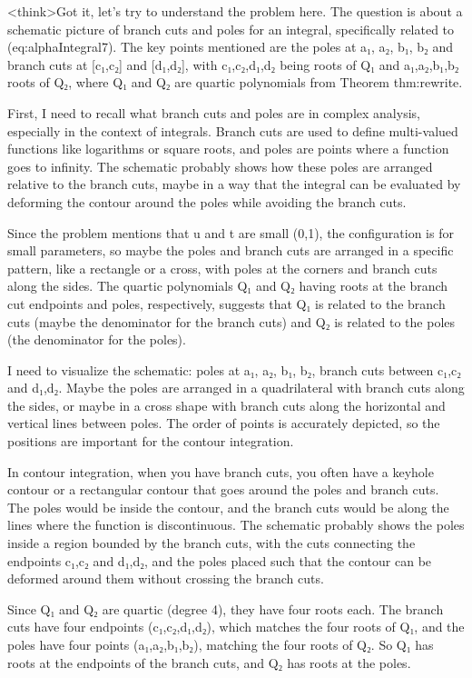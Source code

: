 <think>Got it, let's try to understand the problem here. The question is about a schematic picture of branch cuts and poles for an integral, specifically related to (eq:alphaIntegral7). The key points mentioned are the poles at a₁, a₂, b₁, b₂ and branch cuts at [c₁,c₂] and [d₁,d₂], with c₁,c₂,d₁,d₂ being roots of Q₁ and a₁,a₂,b₁,b₂ roots of Q₂, where Q₁ and Q₂ are quartic polynomials from Theorem thm:rewrite. 

First, I need to recall what branch cuts and poles are in complex analysis, especially in the context of integrals. Branch cuts are used to define multi-valued functions like logarithms or square roots, and poles are points where a function goes to infinity. The schematic probably shows how these poles are arranged relative to the branch cuts, maybe in a way that the integral can be evaluated by deforming the contour around the poles while avoiding the branch cuts.

Since the problem mentions that u and t are small (0,1), the configuration is for small parameters, so maybe the poles and branch cuts are arranged in a specific pattern, like a rectangle or a cross, with poles at the corners and branch cuts along the sides. The quartic polynomials Q₁ and Q₂ having roots at the branch cut endpoints and poles, respectively, suggests that Q₁ is related to the branch cuts (maybe the denominator for the branch cuts) and Q₂ is related to the poles (the denominator for the poles).

I need to visualize the schematic: poles at a₁, a₂, b₁, b₂, branch cuts between c₁,c₂ and d₁,d₂. Maybe the poles are arranged in a quadrilateral with branch cuts along the sides, or maybe in a cross shape with branch cuts along the horizontal and vertical lines between poles. The order of points is accurately depicted, so the positions are important for the contour integration.

In contour integration, when you have branch cuts, you often have a keyhole contour or a rectangular contour that goes around the poles and branch cuts. The poles would be inside the contour, and the branch cuts would be along the lines where the function is discontinuous. The schematic probably shows the poles inside a region bounded by the branch cuts, with the cuts connecting the endpoints c₁,c₂ and d₁,d₂, and the poles placed such that the contour can be deformed around them without crossing the branch cuts.

Since Q₁ and Q₂ are quartic (degree 4), they have four roots each. The branch cuts have four endpoints (c₁,c₂,d₁,d₂), which matches the four roots of Q₁, and the poles have four points (a₁,a₂,b₁,b₂), matching the four roots of Q₂. So Q₁ has roots at the endpoints of the branch cuts, and Q₂ has roots at the poles. 

